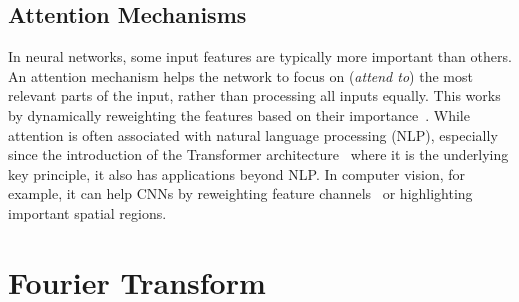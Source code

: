 \subsection{Attention Mechanisms}

In neural networks, some input features are typically more important than others.
An attention mechanism helps the network to focus on (\textit{attend to}) the most relevant parts of the input, rather than processing all inputs equally.
This works by dynamically reweighting the features based on their importance~\cite{Attention}.
While attention is often associated with natural language processing (NLP), especially since the introduction of the Transformer architecture~\cite{Transformer} where it is the underlying key principle, it also has applications beyond NLP.\@
In computer vision, for example, it can help CNNs by reweighting feature channels~\cite{SqueezeExcite} or highlighting important spatial regions.

\section{Fourier Transform}
